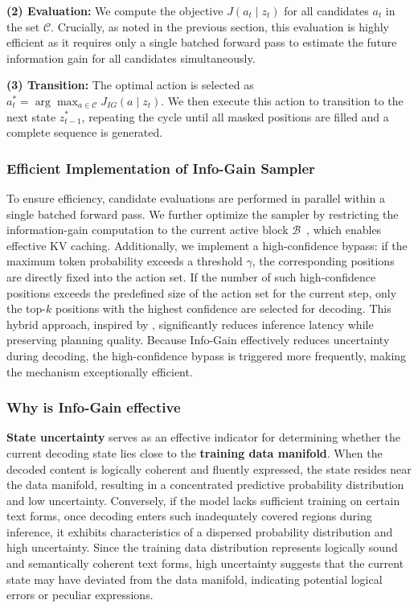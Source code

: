 \textbf{(2) Evaluation:} We compute the objective $J(a_t\mid z_t)$ for all candidates $a_t$ in the set $\mathcal{C}$. Crucially, as noted in the previous section, this evaluation is highly efficient as it requires only a single batched forward pass to estimate the future information gain for all candidates simultaneously.

\textbf{(3) Transition:} The optimal action is selected as $a_t^* = \arg\max_{a\in \mathcal{C}} J_{IG}(a \mid z_t)$. We then execute this action to transition to the next state $z_{t-1}^*$, repeating the cycle until all masked positions are filled and a complete sequence is generated.


\subsubsection{Efficient Implementation of Info-Gain Sampler}
\label{sec:acceleration}
To ensure efficiency, candidate evaluations are performed in parallel within a single batched forward pass. We further optimize the sampler by restricting the information-gain computation to the current active block $\mathcal{B}$~\citep{arriola2025block}, which enables effective KV caching. Additionally, we implement a high-confidence bypass: if the maximum token probability exceeds a threshold $\gamma$, the corresponding positions are directly fixed into the action set. If the number of such high-confidence positions exceeds the predefined size of the action set for the current step, only the top-$k$ positions with the highest confidence are selected for decoding. This hybrid approach, inspired by \citet{wu2025fast}, significantly reduces inference latency while preserving planning quality. Because Info-Gain effectively reduces uncertainty during decoding, the high-confidence bypass is triggered more frequently, making the mechanism exceptionally efficient.


\subsubsection{Why is Info-Gain effective}

\textbf{State uncertainty} serves as an effective indicator for determining whether the current decoding state lies close to the \textbf{training data manifold}. When the decoded content is logically coherent and fluently expressed, the state resides near the data manifold, resulting in a concentrated predictive probability distribution and low uncertainty. Conversely, if the model lacks sufficient training on certain text forms, once decoding enters such inadequately covered regions during inference, it exhibits characteristics of a dispersed probability distribution and high uncertainty. Since the training data distribution represents logically sound and semantically coherent text forms, high uncertainty suggests that the current state may have deviated from the data manifold, indicating potential logical errors or peculiar expressions.


